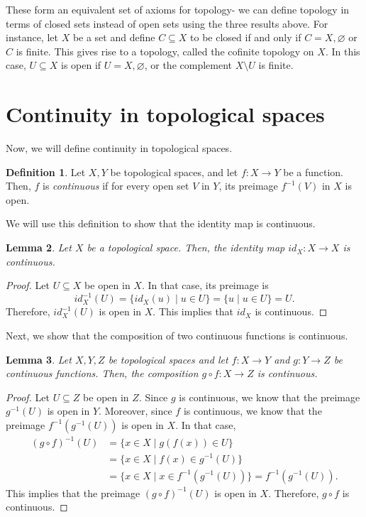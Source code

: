 \documentclass[a4paper, openany]{memoir}
\theoremstyle{definition}
\newtheorem{definition}{Definition}[section]
\theoremstyle{plain}
\newtheorem{lemma}[definition]{Lemma}
\begin{document}
\noindent These form an equivalent set of axioms for topology- we can define topology in terms of closed sets instead of open sets using the three results above. For instance, let $X$ be a set and define $C \subseteq X$ to be closed if and only if $C = X, \varnothing$ or $C$ is finite. This gives rise to a topology, called the cofinite topology on $X$. In this case, $U \subseteq X$ is open if $U = X, \varnothing$, or the complement $X \setminus U$ is finite.
\newpage

\section{Continuity in topological spaces}
Now, we will define continuity in topological spaces.
\begin{definition}
Let $X, Y$ be topological spaces, and let $f: X \to Y$ be a function. Then, $f$ is \emph{continuous} if for every open set $V$ in $Y$, its preimage $f^{-1}(V)$ in $X$ is open.
\end{definition}
\noindent We will use this definition to show that the identity map is continuous.
\begin{lemma}
Let $X$ be a topological space. Then, the identity map $id_X: X \to X$ is continuous.
\end{lemma}
\begin{proof}
Let $U \subseteq X$ be open in $X$. In that case, its preimage is
\[id_X^{-1}(U) = \{id_X(u) \mid u \in U\} = \{u \mid u \in U\} = U.\]
Therefore, $id_X^{-1}(U)$ is open in $X$. This implies that $id_X$ is continuous.
\end{proof}
\noindent Next, we show that the composition of two continuous functions is continuous.
\begin{lemma}
Let $X, Y, Z$ be topological spaces and let $f: X \to Y$ and $g: Y \to Z$ be continuous functions. Then, the composition $g \circ f: X \to Z$ is continuous.
\end{lemma}
\begin{proof}
Let $U \subseteq Z$ be open in $Z$. Since $g$ is continuous, we know that the preimage $g^{-1}(U)$ is open in $Y$. Moreover, since $f$ is continuous, we know that the preimage $f^{-1}(g^{-1}(U))$ is open in $X$. In that case,
\begin{align*}
    (g \circ f)^{-1}(U) &= \{x \in X \mid g(f(x)) \in U\} \\
    &= \{x \in X \mid f(x) \in g^{-1}(U)\} \\
    &= \{x \in X \mid x \in f^{-1}(g^{-1}(U))\} = f^{-1}(g^{-1}(U)).
\end{align*}
This implies that the preimage $(g \circ f)^{-1}(U)$ is open in $X$. Therefore, $g \circ f$ is continuous.
\end{proof}
\end{document}
